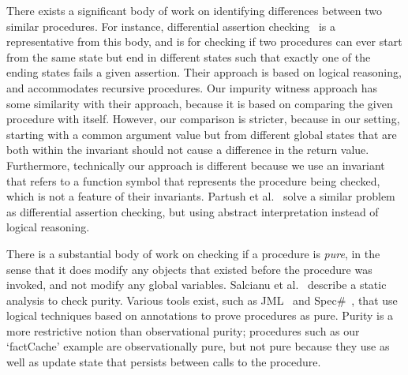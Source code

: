 There exists a significant body of work on identifying differences between
two similar procedures.  For instance, differential assertion
checking~\cite{lahiri2013differential} is a representative from this body,
and is for checking if two procedures can ever start from the same state
but end in different states such that exactly one of the ending states
fails a given assertion. Their
approach is based on logical reasoning, and accommodates recursive
procedures. Our impurity witness approach has some similarity with their
approach, because it is based on comparing the given procedure with
itself. However, our comparison is stricter, because in our setting,
starting with a common argument value but from different global states that
are both within the invariant should not cause a difference in the return
value. Furthermore, technically our approach is different because we use an
invariant that refers to a function symbol that represents the procedure
being checked, which is not a feature of their invariants. Partush et
al.~\cite{partush2013abstract} solve a similar problem as differential
assertion checking, but using abstract interpretation instead of logical
reasoning.

There is a substantial body of work on checking if a procedure is
\emph{pure}, in the sense that it does
modify any objects that existed before the procedure was invoked, and not
modify any  global variables. Salcianu et
al.~\cite{sualcianu2005purity} describe a static analysis to check purity.
Various tools exist, such as
JML~\cite{leavens2008jml} and Spec\#~\cite{specSharp}, that use logical
techniques based on annotations to prove procedures as pure.  Purity is a
more restrictive notion than observational purity; procedures such
as our `factCache' example are observationally pure, but not pure because
they use as well as update state that persists between calls to the
procedure. 


\nocite{barnett2004spec}
\nocite{lahiri2013differential}
\nocite{de2008z3}
\nocite{alpern1988detecting}
\nocite{sondergaard1990referential}
\nocite{flanagan2001avoiding}
\nocite{sualcianu2005purity}
\nocite{cytron1991efficiently}
\nocite{leino2008boogie}
